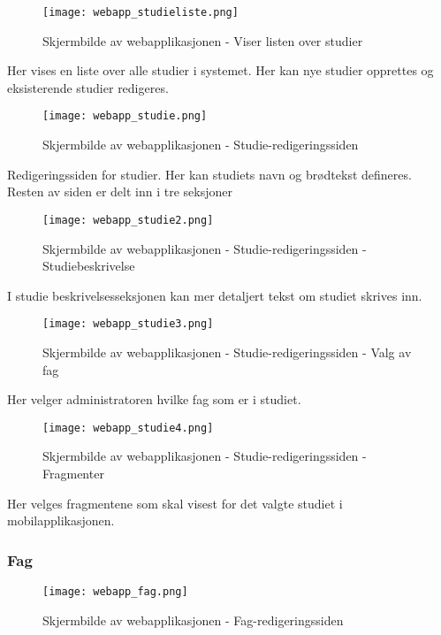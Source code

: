 \documentclass[../main.tex]{subfiles}
\begin{document}
\begin{figure}[H]
  \centering
  \texttt{[image: webapp\_studieliste.png]}
  \caption{Skjermbilde av webapplikasjonen - Viser listen over studier}
\end{figure}

Her vises en liste over alle studier i systemet. Her kan nye studier opprettes og eksisterende studier redigeres.

\begin{figure}[H]
  \centering
  \texttt{[image: webapp\_studie.png]}
  \caption{Skjermbilde av webapplikasjonen - Studie-redigeringssiden}
\end{figure}

Redigeringssiden for studier. Her kan studiets navn og brødtekst defineres. Resten av siden er delt inn i tre seksjoner

\begin{figure}[H]
  \centering
  \texttt{[image: webapp\_studie2.png]}
  \caption{Skjermbilde av webapplikasjonen - Studie-redigeringssiden - Studiebeskrivelse}
\end{figure}

I studie beskrivelsesseksjonen kan mer detaljert tekst om studiet skrives inn.

\begin{figure}[H]
  \centering
  \texttt{[image: webapp\_studie3.png]}
  \caption{Skjermbilde av webapplikasjonen - Studie-redigeringssiden - Valg av fag}
\end{figure}

Her velger administratoren hvilke fag som er i studiet.

\begin{figure}[H]
  \centering
  \texttt{[image: webapp\_studie4.png]}
  \caption{Skjermbilde av webapplikasjonen - Studie-redigeringssiden - Fragmenter}
\end{figure}

Her velges fragmentene som skal visest for det valgte studiet i mobilapplikasjonen.

\subsubsection{Fag}

\begin{figure}[H]
  \centering
  \texttt{[image: webapp\_fag.png]}
  \caption{Skjermbilde av webapplikasjonen - Fag-redigeringssiden}
\end{figure}
\end{document}
